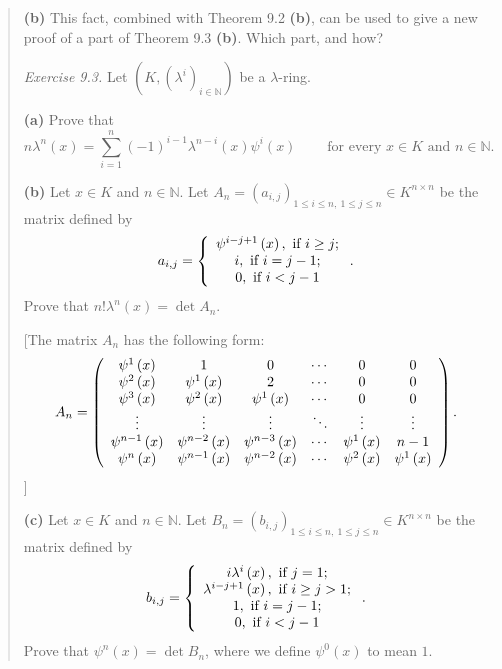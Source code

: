 \documentclass[numbers=enddot,12pt,final,onecolumn,notitlepage]{scrartcl}%
\begin{document}
\begin{quotation}
\textbf{(b)} This fact, combined with Theorem 9.2 \textbf{(b)}, can be used to
give a new proof of a part of Theorem 9.3 \textbf{(b)}. Which part, and how?

\textit{Exercise 9.3.} Let $\left(  K,\left(  \lambda^{i}\right)
_{i\in\mathbb{N}}\right)  $ be a $\lambda$-ring.

\textbf{(a)} Prove that%
\[
n\lambda^{n}\left(  x\right)  =\sum_{i=1}^{n}\left(  -1\right)  ^{i-1}%
\lambda^{n-i}\left(  x\right)  \psi^{i}\left(  x\right)
\ \ \ \ \ \ \ \ \ \ \text{for every }x\in K\text{ and }n\in\mathbb{N}\text{.}%
\]


\textbf{(b)} Let $x\in K$ and $n\in\mathbb{N}$. Let $A_{n}=\left(
a_{i,j}\right)  _{1\leq i\leq n,\ 1\leq j\leq n}\in K^{n\times n}$ be the
matrix defined by%
\[
a_{i,j}=\left\{
\begin{array}
[c]{c}%
\psi^{i-j+1}\left(  x\right)  ,\text{ if }i\geq j;\\
i,\text{ if }i=j-1;\\
0,\text{ if }i<j-1
\end{array}
\right.  .
\]
Prove that $n!\lambda^{n}\left(  x\right)  =\det A_{n}$.

[The matrix $A_{n}$ has the following form:%
\[
A_{n}=\left(
\begin{array}
[c]{cccccc}%
\psi^{1}\left(  x\right)  & 1 & 0 & \cdots & 0 & 0\\
\psi^{2}\left(  x\right)  & \psi^{1}\left(  x\right)  & 2 & \cdots & 0 & 0\\
\psi^{3}\left(  x\right)  & \psi^{2}\left(  x\right)  & \psi^{1}\left(
x\right)  & \cdots & 0 & 0\\
\vdots & \vdots & \vdots & \ddots & \vdots & \vdots\\
\psi^{n-1}\left(  x\right)  & \psi^{n-2}\left(  x\right)  & \psi^{n-3}\left(
x\right)  & \cdots & \psi^{1}\left(  x\right)  & n-1\\
\psi^{n}\left(  x\right)  & \psi^{n-1}\left(  x\right)  & \psi^{n-2}\left(
x\right)  & \cdots & \psi^{2}\left(  x\right)  & \psi^{1}\left(  x\right)
\end{array}
\right)  .
\]
]

\textbf{(c)} Let $x\in K$ and $n\in\mathbb{N}$. Let $B_{n}=\left(
b_{i,j}\right)  _{1\leq i\leq n,\ 1\leq j\leq n}\in K^{n\times n}$ be the
matrix defined by%
\[
b_{i,j}=\left\{
\begin{array}
[c]{c}%
i\lambda^{i}\left(  x\right)  ,\text{ if }j=1;\\
\lambda^{i-j+1}\left(  x\right)  ,\text{ if }i\geq j>1;\\
1,\text{ if }i=j-1;\\
0,\text{ if }i<j-1
\end{array}
\right.  .
\]
Prove that $\psi^{n}\left(  x\right)  =\det B_{n}$, where we define $\psi
^{0}\left(  x\right)  $ to mean $1$.


\end{quotation}
\end{document}
